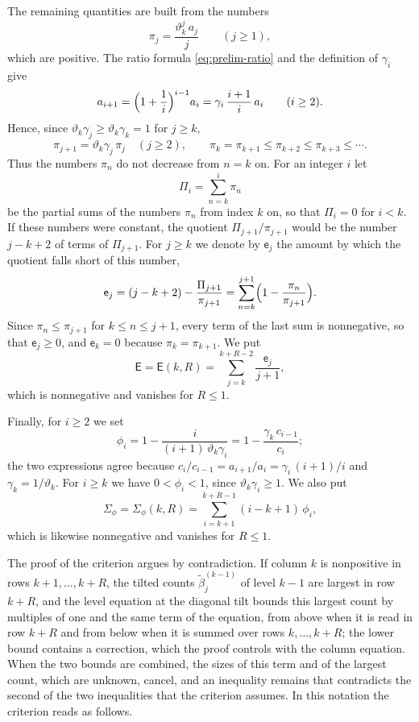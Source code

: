\documentclass{amsart}
\theoremstyle{definition}
\theoremstyle{remark}
\numberwithin{equation}{section}
\begin{document}
The remaining quantities are built from the numbers
\[
\pi_j=\frac{\vartheta_k^j\,a_j}{j}\qquad(j\ge 1),
\]
which are positive. The ratio formula \eqref{eq:prelim-ratio} and the definition of $\gamma_i$ give
\[
a_{i+1}=\Bigl(1+\frac1i\Bigr)^{i-1}a_i=\gamma_i\,\frac{i+1}{i}\,a_i\qquad(i\ge 2).
\]
Hence, since $\vartheta_k\gamma_j\ge\vartheta_k\gamma_k=1$ for $j\ge k$,
\[
\pi_{j+1}=\vartheta_k\gamma_j\,\pi_j\quad(j\ge 2),\qquad \pi_k=\pi_{k+1}\le\pi_{k+2}\le\pi_{k+3}\le\cdots .
\]
Thus the numbers $\pi_n$ do not decrease from $n=k$ on.
For an integer $i$ let
\[
\Pi_i=\sum_{n=k}^{i}\pi_n
\]
be the partial sums of the numbers $\pi_n$ from index $k$ on, so that $\Pi_i=0$ for $i<k$. If these numbers were constant, the quotient $\Pi_{j+1}/\pi_{j+1}$ would be the number $j-k+2$ of terms of $\Pi_{j+1}$. For $j\ge k$ we denote by $\mathsf e_j$ the amount by which the quotient falls short of this number,
\[
\mathsf e_j=(j-k+2)-\frac{\Pi_{j+1}}{\pi_{j+1}}=\sum_{n=k}^{j+1}\Bigl(1-\frac{\pi_n}{\pi_{j+1}}\Bigr).
\]
Since $\pi_n\le\pi_{j+1}$ for $k\le n\le j+1$, every term of the last sum is nonnegative, so that $\mathsf e_j\ge 0$, and $\mathsf e_k=0$ because $\pi_k=\pi_{k+1}$. We put
\[
\mathsf E=\mathsf E(k,R)=\sum_{j=k}^{k+R-2}\frac{\mathsf e_j}{j+1},
\]
which is nonnegative and vanishes for $R\le 1$.

Finally, for $i\ge 2$ we set
\[
\phi_i=1-\frac{i}{(i+1)\,\vartheta_k\gamma_i}=1-\frac{\gamma_k\,c_{i-1}}{c_i};
\]
the two expressions agree because $c_i/c_{i-1}=a_{i+1}/a_i=\gamma_i\,(i+1)/i$ and $\gamma_k=1/\vartheta_k$. For $i\ge k$ we have $0<\phi_i<1$, since $\vartheta_k\gamma_i\ge 1$. We also put
\[
\Sigma_\phi=\Sigma_\phi(k,R)=\sum_{i=k+1}^{k+R-1}(i-k+1)\,\phi_i ,
\]
which is likewise nonnegative and vanishes for $R\le 1$.

The proof of the criterion argues by contradiction. If column $k$ is nonpositive in rows $k+1,\dots,k+R$, the tilted counts $\tilde\beta^{(k-1)}_j$ of level $k-1$ are largest in row $k+R$, and the level equation at the diagonal tilt bounds this largest count by multiples of one and the same term of the equation, from above when it is read in row $k+R$ and from below when it is summed over rows $k,\dots,k+R$; the lower bound contains a correction, which the proof controls with the column equation. When the two bounds are combined, the sizes of this term and of the largest count, which are unknown, cancel, and an inequality remains that contradicts the second of the two inequalities that the criterion assumes. In this notation the criterion reads as follows.
\end{document}
